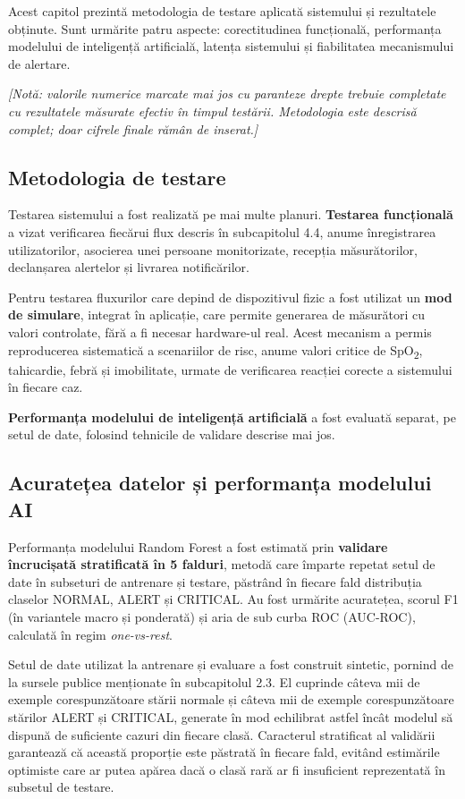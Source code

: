 \documentclass[12pt,a4paper]{article}
\newcommand{\spo}{SpO\textsubscript{2}}
\begin{document}
Acest capitol prezintă metodologia de testare aplicată sistemului și rezultatele obținute. Sunt urmărite patru aspecte: corectitudinea funcțională, performanța modelului de inteligență artificială, latența sistemului și fiabilitatea mecanismului de alertare.

\textit{[Notă: valorile numerice marcate mai jos cu paranteze drepte trebuie completate cu rezultatele măsurate efectiv în timpul testării. Metodologia este descrisă complet; doar cifrele finale rămân de inserat.]}

\subsection{Metodologia de testare}

Testarea sistemului a fost realizată pe mai multe planuri. \textbf{Testarea funcțională} a vizat verificarea fiecărui flux descris în subcapitolul 4.4, anume înregistrarea utilizatorilor, asocierea unei persoane monitorizate, recepția măsurătorilor, declanșarea alertelor și livrarea notificărilor.

Pentru testarea fluxurilor care depind de dispozitivul fizic a fost utilizat un \textbf{mod de simulare}, integrat în aplicație, care permite generarea de măsurători cu valori controlate, fără a fi necesar hardware-ul real. Acest mecanism a permis reproducerea sistematică a scenariilor de risc, anume valori critice de \spo, tahicardie, febră și imobilitate, urmate de verificarea reacției corecte a sistemului în fiecare caz.

\textbf{Performanța modelului de inteligență artificială} a fost evaluată separat, pe setul de date, folosind tehnicile de validare descrise mai jos.

\subsection{Acuratețea datelor și performanța modelului AI}

Performanța modelului Random Forest a fost estimată prin \textbf{validare încrucișată stratificată în 5 falduri}, metodă care împarte repetat setul de date în subseturi de antrenare și testare, păstrând în fiecare fald distribuția claselor NORMAL, ALERT și CRITICAL. Au fost urmărite acuratețea, scorul F1 (în variantele macro și ponderată) și aria de sub curba ROC (AUC-ROC), calculată în regim \textit{one-vs-rest}.

Setul de date utilizat la antrenare și evaluare a fost construit sintetic, pornind de la sursele publice menționate în subcapitolul 2.3. El cuprinde câteva mii de exemple corespunzătoare stării normale și câteva mii de exemple corespunzătoare stărilor ALERT și CRITICAL, generate în mod echilibrat astfel încât modelul să dispună de suficiente cazuri din fiecare clasă. Caracterul stratificat al validării garantează că această proporție este păstrată în fiecare fald, evitând estimările optimiste care ar putea apărea dacă o clasă rară ar fi insuficient reprezentată în subsetul de testare.
\end{document}
